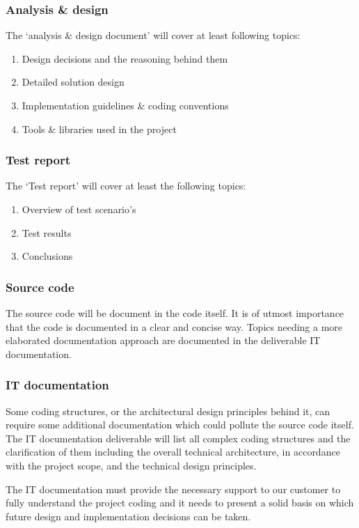 \subsubsection{Analysis \& design}
The `analysis \& design document' will cover at least following topics:

	\begin{enumerate}
		\item Design decisions and the reasoning behind them
		\item Detailed solution design
		\item Implementation guidelines \& coding conventions
		\item Tools \& libraries used in the project
	\end {enumerate}

\subsubsection{Test report}
The `Test report' will cover at least the following topics:

	\begin{enumerate}
		\item Overview of test scenario's
		\item Test results
		\item Conclusions
	\end {enumerate}

\subsubsection{Source code}
The source code will be document in the code itself.
It is of utmost importance that the code is documented in a clear and concise way.
Topics needing a more elaborated documentation approach are documented in the deliverable IT documentation.

\subsubsection{IT documentation}
Some coding structures, or the architectural design principles behind it, can require some additional documentation which could pollute the source code itself.
The IT documentation deliverable will list all complex coding structures and the clarification of them including the overall technical architecture, in accordance with the project scope, and the technical design principles.

The IT documentation must provide the necessary support to our customer to fully understand the project coding and it needs to present a solid basis on which future design and implementation decisions can be taken.


